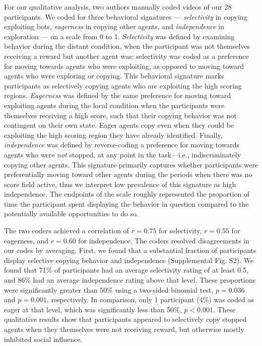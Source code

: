 \documentclass[12pt,letterpaper]{article}
\begin{document}
For our qualitative analysis, two authors manually coded videos of our 28 participants. We coded for three behavioral signatures --- \emph{selectivity} in copying exploiting bots, \emph{eagerness} in copying other agents, and \emph{independence} in exploration --- on a scale from 0 to 1. \emph{Selectivity} was defined by examining behavior during the distant condition, when the participant was not themselves receiving a reward but another agent was: selectivity was coded as a preference for moving towards agents who were exploiting, as opposed to moving toward agents who were exploring or copying. This behavioral signature marks participants as selectively copying agents who are exploiting the high scoring regions.
\emph{Eagerness} was defined by the same preference for moving toward exploiting agents during the local condition when the participants were themselves receiving a high score, such that their copying behavior was not contingent on their own state. Eager agents copy even when they could be exploiting the high scoring region they have already identified.
Finally, \emph{independence} was defined by reverse-coding a preference for moving towards agents who were \emph{not} stopped, at any point in the task---i.e., indiscriminately copying other agents. This signature primarily captures whether participants were preferentially moving toward other agents during the periods when there was no score field active, thus we interpret low prevalence of this signature as high independence. 
The endpoints of the scale roughly represented the proportion of time the participant spent displaying the behavior in question compared to the potentially available opportunities to do so. 

The two coders achieved a correlation of $r = 0.75$ for selectivity, $r = 0.55$ for eagerness, and $r = 0.60$ for independence. The coders resolved disagreements in our codes by averaging. 
First, we found that a substantial fraction of participants display selective copying behavior and independence (Supplemental Fig. S2). 
We found that 71\% of participants had an average selectivity rating of at least 0.5, and 86\% had an average independence rating above that level. 
These proportions were significantly greater than 50\% using a two-sided binomial test, $p = 0.036$ and $p = 0.001$, respectively.  
In comparison, only 1 participant (4\%) was coded as eager at that level, which was significantly less than 50\%, $p < 0.001$.
These qualitative results show that participants appeared to selectively copy stopped agents when they themselves were not receiving reward, but otherwise mostly inhibited social influence.
\end{document}
